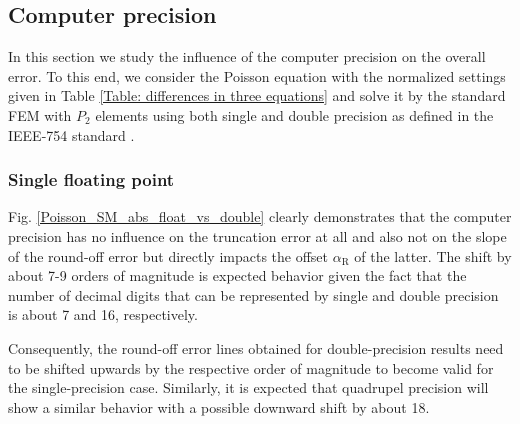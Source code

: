 \documentclass[final,3p]{elsarticle}
\begin{document}
\subsection{Computer precision}	\label{section_working_precision}

In this section we study the influence of the computer precision on the overall error. To this end, we consider the Poisson equation with the normalized settings given in Table \ref{Table: differences in three equations} and solve it by the standard FEM with $P_2$ elements using both single and double precision as defined in the IEEE-754 standard \cite{zuras2008ieee}.

\subsubsection{Single floating point}

Fig. \ref{Poisson_SM_abs_float_vs_double} clearly demonstrates that the computer precision has no influence on the truncation error at all and also not on the slope of the round-off error but directly impacts the offset $\alpha_{\text{R}}$ of the latter. The shift by about 7-9 orders of magnitude is expected behavior given the fact that the number of decimal digits that can be represented by single and double precision is about 7 and 16, respectively.

Consequently, the round-off error lines obtained for double-precision results need to be shifted upwards by the respective order of magnitude to become valid for the single-precision case. Similarly, it is expected that quadrupel precision will show a similar behavior with a possible downward shift by about 18.

\end{document}
